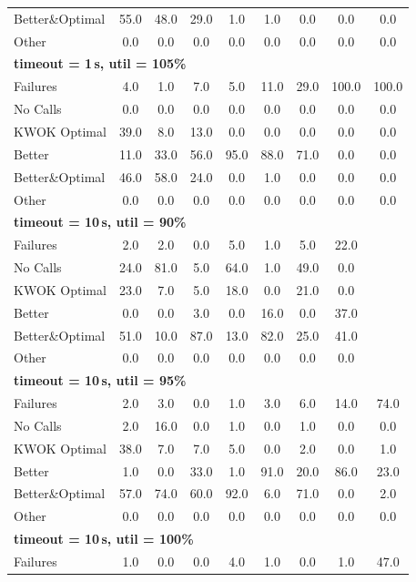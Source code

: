 \begin{tabular}{l cccccccc}
Better\&Optimal & 55.0 & 48.0 & 29.0 & 1.0 & 1.0 & 0.0 & 0.0 & 0.0 \\
Other & 0.0 & 0.0 & 0.0 & 0.0 & 0.0 & 0.0 & 0.0 & 0.0 \\
\midrule
\multicolumn{9}{l}{\textbf{timeout = 1\,s, util = 105\%}} \\
\midrule
Failures & 4.0 & 1.0 & 7.0 & 5.0 & 11.0 & 29.0 & 100.0 & 100.0 \\
No Calls & 0.0 & 0.0 & 0.0 & 0.0 & 0.0 & 0.0 & 0.0 & 0.0 \\
KWOK Optimal & 39.0 & 8.0 & 13.0 & 0.0 & 0.0 & 0.0 & 0.0 & 0.0 \\
Better & 11.0 & 33.0 & 56.0 & 95.0 & 88.0 & 71.0 & 0.0 & 0.0 \\
Better\&Optimal & 46.0 & 58.0 & 24.0 & 0.0 & 1.0 & 0.0 & 0.0 & 0.0 \\
Other & 0.0 & 0.0 & 0.0 & 0.0 & 0.0 & 0.0 & 0.0 & 0.0 \\
\midrule
\multicolumn{9}{l}{\textbf{timeout = 10\,s, util = 90\%}} \\
\midrule
Failures & 2.0 & 2.0 & 0.0 & 5.0 & 1.0 & 5.0 & 22.0 & \text{--} \\
No Calls & 24.0 & 81.0 & 5.0 & 64.0 & 1.0 & 49.0 & 0.0 & \text{--} \\
KWOK Optimal & 23.0 & 7.0 & 5.0 & 18.0 & 0.0 & 21.0 & 0.0 & \text{--} \\
Better & 0.0 & 0.0 & 3.0 & 0.0 & 16.0 & 0.0 & 37.0 & \text{--} \\
Better\&Optimal & 51.0 & 10.0 & 87.0 & 13.0 & 82.0 & 25.0 & 41.0 & \text{--} \\
Other & 0.0 & 0.0 & 0.0 & 0.0 & 0.0 & 0.0 & 0.0 & \text{--} \\
\midrule
\multicolumn{9}{l}{\textbf{timeout = 10\,s, util = 95\%}} \\
\midrule
Failures & 2.0 & 3.0 & 0.0 & 1.0 & 3.0 & 6.0 & 14.0 & 74.0 \\
No Calls & 2.0 & 16.0 & 0.0 & 1.0 & 0.0 & 1.0 & 0.0 & 0.0 \\
KWOK Optimal & 38.0 & 7.0 & 7.0 & 5.0 & 0.0 & 2.0 & 0.0 & 1.0 \\
Better & 1.0 & 0.0 & 33.0 & 1.0 & 91.0 & 20.0 & 86.0 & 23.0 \\
Better\&Optimal & 57.0 & 74.0 & 60.0 & 92.0 & 6.0 & 71.0 & 0.0 & 2.0 \\
Other & 0.0 & 0.0 & 0.0 & 0.0 & 0.0 & 0.0 & 0.0 & 0.0 \\
\midrule
\multicolumn{9}{l}{\textbf{timeout = 10\,s, util = 100\%}} \\
\midrule
Failures & 1.0 & 0.0 & 0.0 & 4.0 & 1.0 & 0.0 & 1.0 & 47.0 \\

\end{tabular}
